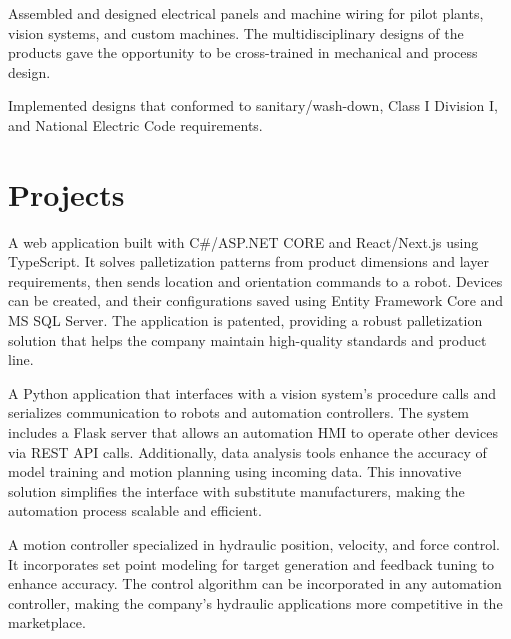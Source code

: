 \documentclass[]{TTurner}
\begin{document}
\begin{minipage}[t]{0.7\textwidth}
\begin{tightemize}
\sectionsep
\item Assembled and designed electrical panels and machine wiring for pilot plants, vision systems, and custom machines. The multidisciplinary designs of the products gave the opportunity to be cross-trained in mechanical and process design. 
\item Implemented designs that conformed to sanitary/wash-down, Class I Division I, and National Electric Code requirements.              
\end{tightemize}
\sectionsep

\section{Projects}

\begin{tightemize}
\item A web application built with C\#/ASP.NET CORE and React/Next.js using TypeScript. It solves palletization patterns from product dimensions and layer requirements, then sends location and orientation commands to a robot. Devices can be created, and their configurations saved using Entity Framework Core and MS SQL Server.  The application is patented, providing a robust palletization solution that helps the company maintain high-quality standards and product line.
\end{tightemize}
\sectionsep

\begin{tightemize}
\item A Python application that interfaces with a vision system's procedure calls and serializes communication to robots and automation controllers. The system includes a Flask server that allows an automation HMI to operate other devices via REST API calls. Additionally, data analysis tools enhance the accuracy of model training and motion planning using incoming data. This innovative solution simplifies the interface with substitute manufacturers, making the automation process scalable and efficient.
\end{tightemize}
\sectionsep

\begin{tightemize}
\item A motion controller specialized in hydraulic position, velocity, and force control. It incorporates set point modeling for target generation and feedback tuning to enhance accuracy. The control algorithm can be incorporated in any automation controller, making the company's hydraulic applications more competitive in the marketplace. 
\end{tightemize}
\sectionsep


\end{minipage} 
\end{document}
